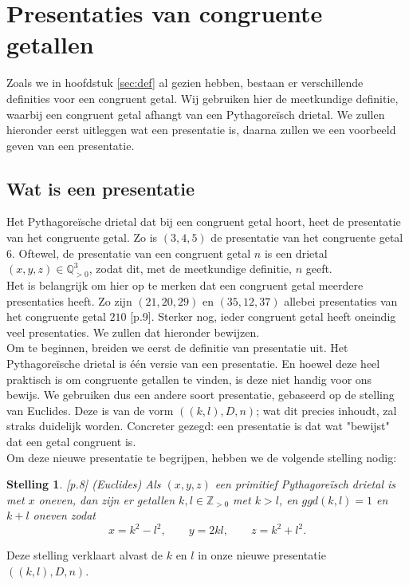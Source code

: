 \documentclass[12pt,reqno]{article}
\newcommand*{\ZZ}{\ensuremath{\mathbb{Z}}}
\newcommand*{\QQ}{\ensuremath{\mathbb{Q}}}
\theoremstyle{theorem}
\newtheorem{theorem}{Stelling}
\theoremstyle{definition}
\begin{document}
	
	\section{Presentaties van congruente getallen}
	Zoals we in hoofdstuk \ref{sec:def} al gezien hebben, bestaan er verschillende definities voor een congruent getal. Wij gebruiken hier de meetkundige definitie, waarbij een congruent getal afhangt van een Pythagore\"isch drietal. We zullen hieronder eerst uitleggen wat een presentatie is, daarna zullen we een voorbeeld geven van een presentatie.
	
	\subsection{Wat is een presentatie}\label{sec:presentaties}
	Het Pythagore\"ische drietal dat bij een congruent getal hoort, heet de presentatie van het congruente getal. Zo is $(3,4,5)$ de presentatie van het congruente getal $6$. Oftewel,  de presentatie van een congruent getal $n$ is een drietal $(x,y,z)\in\QQ^3_{>0}$, zodat dit, met de meetkundige definitie, $n$ geeft.\\
	
	Het is belangrijk om hier op te merken dat een congruent getal meerdere presentaties heeft. Zo zijn $(21,20,29)$ en $(35,12,37)$ allebei presentaties van het congruente getal $210$ \cite{Oort}[p.9]. Sterker nog, ieder congruent getal heeft oneindig veel presentaties. We zullen dat hieronder bewijzen.\\
	
	Om te beginnen, breiden we eerst de definitie van presentatie uit. Het Pythagore\"ische drietal is \'e\'en versie van een presentatie. En hoewel deze heel praktisch is om congruente getallen te vinden, is deze niet handig voor ons bewijs. We gebruiken dus een andere soort presentatie, gebaseerd op de stelling van Euclides. Deze is van de vorm $((k,l),D,n)$; wat dit precies inhoudt, zal straks duidelijk worden. Concreter gezegd: een presentatie is dat wat "bewijst" dat een getal congruent is.\\
	
	Om deze nieuwe presentatie te begrijpen, hebben we de volgende stelling nodig:
	\begin{theorem}\label{def:euclides}
		\cite{Oort}[p.8] (Euclides) Als $(x,y,z)$ een primitief Pythagore\"isch drietal is met $x$ oneven, dan zijn er getallen $k,l\in\ZZ_{>0}$ met $k>l$, en $ggd(k,l)=1$ en $k+l$ oneven zodat
		\begin{equation*}
			x=k^2-l^2,\qquad y=2kl,\qquad z=k^2+l^2.
		\end{equation*}
	\end{theorem}
	\noindent Deze stelling verklaart alvast de $k$ en $l$ in onze nieuwe presentatie $((k,l),D,n)$.\\
	
\end{document}
